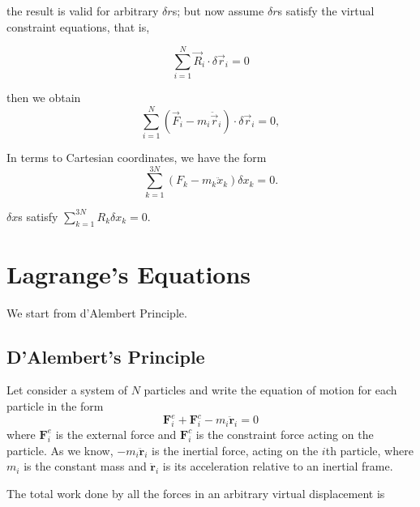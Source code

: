 \documentclass[prb,preprint]{revtex4-1}
\newcommand{\dr}{\delta \mathbf{r}}
\begin{document}
 the result is valid for arbitrary $\delta r$s; but now assume $\delta
 r$s satisfy the virtual constraint equations, that is,

\begin{equation}
  \label{eq:idealconstraints}
  \sum_{i=1}^N \vec{R}_i \cdot \delta \vec{r}_i = 0
\end{equation}

then we obtain
\begin{equation}
  \label{eq:dalembert-principle-1}
  \sum_{i=1}^N(\vec{F}_i - m_i \ddot{\vec{r}}_i) \cdot \delta \vec{r}_i = 0,
\end{equation}

In terms to Cartesian coordinates, we have the form
\begin{equation}
  \label{eq:dalembert-principle-cartesian}
  \sum_{k=1}^{3N} (F_k - m_k \ddot{x}_k)\delta x_k = 0.
\end{equation}

$\delta x$s satisfy $\sum_{k=1}^{3N}R_k \delta x_k = 0$.

\section{Lagrange's Equations}
\label{sec:lagrangeeom}

We start from d'Alembert Principle. 

\subsection{D'Alembert's Principle}
Let consider a system of $N$ particles and write the equation of motion for each particle in the form
\begin{equation}
  \label{eq:dalembert}
  \mathbf{F}^{e}_i + \mathbf{F}^{c}_i - m_i\mathbf{\ddot{r}}_i = 0
\end{equation}
where $\mathbf{F}^{e}_i$ is the external force and $\mathbf{F}^{c}_i$ is the constraint force acting on the particle. As we know, $-m_i\mathbf{\ddot{r}}_i$ is the inertial force, acting on the $i$th particle, where $m_i$ is the constant mass and $\mathbf{\ddot{r}}_i$ is its acceleration relative to an inertial frame.

The total work done by all the forces in an arbitrary virtual displacement is 

\end{document}
